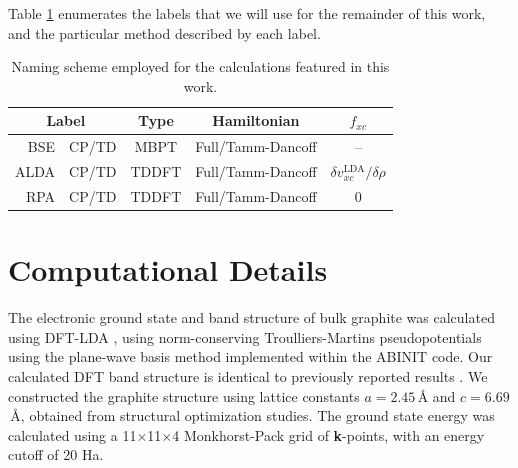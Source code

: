\documentclass[aps,prb,10pt,showpacs,superscriptaddress,twocolumn,notitlepage]{revtex4-1}
\begin{document}
Table \ref{tab:names} enumerates the labels that we will use for the remainder
of this work, and the particular method described by each label.

\begin{table}[b]
\caption{Naming scheme employed for the calculations featured in this work.}
\label{tab:names}
\begin{ruledtabular}
\begin{tabular}{ r l c c c }
\multicolumn{2}{c}{Label}  & Type   & Hamiltonian  & $f_{xc}$ \\
\hline
BSE  & CP/TD & MBPT  & Full/Tamm-Dancoff & -- \\
ALDA & CP/TD & TDDFT & Full/Tamm-Dancoff & $\delta v^{\mathrm{LDA}}_{xc}/\delta\rho$ \\
RPA  & CP/TD & TDDFT & Full/Tamm-Dancoff & $0$
\end{tabular}
\end{ruledtabular}
\end{table}



\section{Computational Details}\label{sec:comp}

The electronic ground state and band structure of bulk graphite was calculated
using DFT-LDA \cite{hohenbergPR64, kohnPR65}, using norm-conserving
Troulliers-Martins pseudopotentials \cite{troullierPRB91} using the plane-wave
basis method implemented within the ABINIT\cite{gonzeCPS09, abinit} code. Our
calculated DFT band structure is identical to previously reported results
\cite{marinopoulosPRB04}. We constructed the graphite structure using lattice
constants $a = 2.45$\,\r{A} and $c = 6.69$\,\r{A}, obtained from structural
optimization studies. The ground state energy was calculated using a
11$\times$11$\times$4 Monkhorst-Pack grid of \textbf{k}-points, with an energy
cutoff of 20 Ha.
\end{document}
